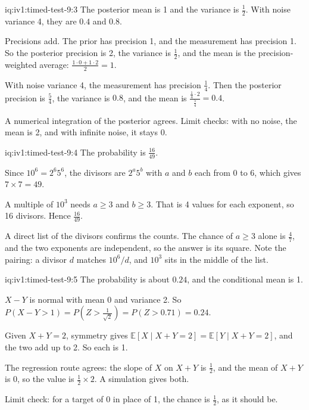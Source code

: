 \begin{solution}{iq:iv1:timed-test-9:3}
The posterior mean is 1 and the variance is $\frac12$. With noise variance 4, they are $0.4$ and $0.8$.

Precisions add. The prior has precision 1, and the measurement has precision 1. So the posterior precision is 2, the variance is $\frac12$, and the mean is the precision-weighted average: $\frac{1 \cdot 0 + 1 \cdot 2}{2} = 1$.

With noise variance 4, the measurement has precision $\frac14$. Then the posterior precision is $\frac54$, the variance is $0.8$, and the mean is $\frac{\frac14 \cdot 2}{\frac54} = 0.4$.

A numerical integration of the posterior agrees. Limit checks: with no noise, the mean is 2, and with infinite noise, it stays 0.

\end{solution}

\begin{solution}{iq:iv1:timed-test-9:4}
The probability is $\frac{16}{49}$.

Since $10^6 = 2^6 5^6$, the divisors are $2^a5^b$ with $a$ and $b$ each from 0 to 6, which gives $7 \times 7 = 49$.

A multiple of $10^3$ needs $a \ge 3$ and $b \ge 3$. That is 4 values for each exponent, so 16 divisors. Hence $\frac{16}{49}$.

A direct list of the divisors confirms the counts. The chance of $a \ge 3$ alone is $\frac47$, and the two exponents are independent, so the answer is its square. Note the pairing: a divisor $d$ matches $10^6/d$, and $10^3$ sits in the middle of the list.

\end{solution}

\begin{solution}{iq:iv1:timed-test-9:5}
The probability is about $0.24$, and the conditional mean is 1.

$X - Y$ is normal with mean 0 and variance 2. So $P(X - Y > 1) = P(Z > \frac{1}{\sqrt2}) = P(Z > 0.71) = 0.24$.

Given $X + Y = 2$, symmetry gives $\mathbb{E}[X \mid X + Y = 2] = \mathbb{E}[Y \mid X + Y = 2]$, and the two add up to 2. So each is 1.

The regression route agrees: the slope of $X$ on $X + Y$ is $\frac12$, and the mean of $X + Y$ is 0, so the value is $\frac12 \times 2$. A simulation gives both.

Limit check: for a target of 0 in place of 1, the chance is $\frac12$, as it should be.

\end{solution}

